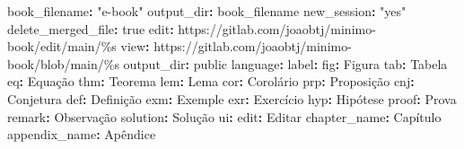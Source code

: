 \documentclass[
]{book}
\newenvironment{Shaded}{\begin{snugshade}}{\end{snugshade}}
\newcommand{\AttributeTok}[1]{\textcolor[rgb]{0.77,0.63,0.00}{#1}}
\newcommand{\CharTok}[1]{\textcolor[rgb]{0.31,0.60,0.02}{#1}}
\newcommand{\FunctionTok}[1]{\textcolor[rgb]{0.00,0.00,0.00}{#1}}
\newcommand{\KeywordTok}[1]{\textcolor[rgb]{0.13,0.29,0.53}{\textbf{#1}}}
\newcommand{\StringTok}[1]{\textcolor[rgb]{0.31,0.60,0.02}{#1}}
\begin{document}
\begin{Shaded}
\begin{Highlighting}[]
\FunctionTok{book\_filename}\KeywordTok{:}\AttributeTok{ }\StringTok{"e{-}book"}
\FunctionTok{output\_dir}\KeywordTok{:}\AttributeTok{ book\_filename}
\FunctionTok{new\_session}\KeywordTok{:}\AttributeTok{ }\StringTok{"yes"}
\FunctionTok{delete\_merged\_file}\KeywordTok{:}\AttributeTok{ }\CharTok{true}
\FunctionTok{edit}\KeywordTok{:}\AttributeTok{ https://gitlab.com/joaobtj/minimo{-}book/edit/main/\%s}
\FunctionTok{view}\KeywordTok{:}\AttributeTok{ https://gitlab.com/joaobtj/minimo{-}book/blob/main/\%s}
\FunctionTok{output\_dir}\KeywordTok{:}\AttributeTok{ public }
\FunctionTok{language}\KeywordTok{:}
\AttributeTok{  }\FunctionTok{label}\KeywordTok{:}
\AttributeTok{    }\FunctionTok{fig}\KeywordTok{:}\AttributeTok{ }\StringTok{\textquotesingle{}Figura \textquotesingle{}}
\AttributeTok{    }\FunctionTok{tab}\KeywordTok{:}\AttributeTok{ }\StringTok{\textquotesingle{}Tabela \textquotesingle{}}
\AttributeTok{    }\FunctionTok{eq}\KeywordTok{:}\AttributeTok{ }\StringTok{\textquotesingle{}Equação \textquotesingle{}}
\AttributeTok{    }\FunctionTok{thm}\KeywordTok{:}\AttributeTok{ }\StringTok{\textquotesingle{}Teorema \textquotesingle{}}
\AttributeTok{    }\FunctionTok{lem}\KeywordTok{:}\AttributeTok{ }\StringTok{\textquotesingle{}Lema \textquotesingle{}}
\AttributeTok{    }\FunctionTok{cor}\KeywordTok{:}\AttributeTok{ }\StringTok{\textquotesingle{}Corolário \textquotesingle{}}
\AttributeTok{    }\FunctionTok{prp}\KeywordTok{:}\AttributeTok{ }\StringTok{\textquotesingle{}Proposição \textquotesingle{}}
\AttributeTok{    }\FunctionTok{cnj}\KeywordTok{:}\AttributeTok{ }\StringTok{\textquotesingle{}Conjetura \textquotesingle{}}
\AttributeTok{    }\FunctionTok{def}\KeywordTok{:}\AttributeTok{ }\StringTok{\textquotesingle{}Definição \textquotesingle{}}
\AttributeTok{    }\FunctionTok{exm}\KeywordTok{:}\AttributeTok{ }\StringTok{\textquotesingle{}Exemple \textquotesingle{}}
\AttributeTok{    }\FunctionTok{exr}\KeywordTok{:}\AttributeTok{ }\StringTok{\textquotesingle{}Exercício \textquotesingle{}}
\AttributeTok{    }\FunctionTok{hyp}\KeywordTok{:}\AttributeTok{ }\StringTok{\textquotesingle{}Hipótese \textquotesingle{}}
\AttributeTok{    }\FunctionTok{proof}\KeywordTok{:}\AttributeTok{ }\StringTok{\textquotesingle{}Prova \textquotesingle{}}
\AttributeTok{    }\FunctionTok{remark}\KeywordTok{:}\AttributeTok{ }\StringTok{\textquotesingle{}Observação \textquotesingle{}}
\AttributeTok{    }\FunctionTok{solution}\KeywordTok{:}\AttributeTok{ }\StringTok{\textquotesingle{}Solução \textquotesingle{}}
\AttributeTok{  }\FunctionTok{ui}\KeywordTok{:}
\AttributeTok{    }\FunctionTok{edit}\KeywordTok{:}\AttributeTok{ }\StringTok{\textquotesingle{}Editar \textquotesingle{}}
\AttributeTok{    }\FunctionTok{chapter\_name}\KeywordTok{:}\AttributeTok{ }\StringTok{\textquotesingle{}Capítulo \textquotesingle{}}
\AttributeTok{    }\FunctionTok{appendix\_name}\KeywordTok{:}\AttributeTok{ }\StringTok{\textquotesingle{}Apêndice \textquotesingle{}}
\end{Highlighting}
\end{Shaded}
\end{document}

